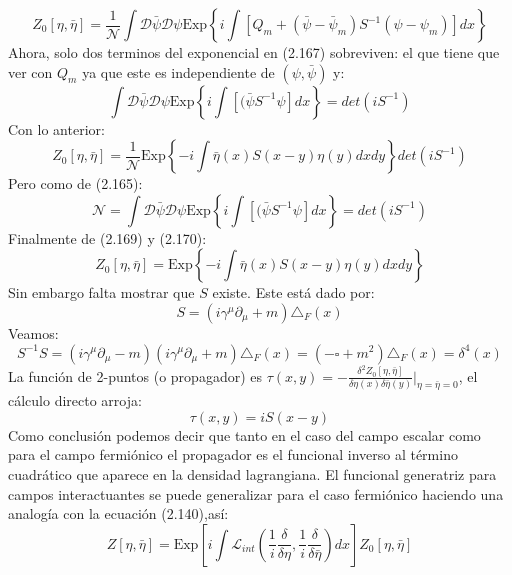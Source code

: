 \begin{equation}
Z_{0}[\eta,\bar{\eta}]=\frac{1}{\mathcal{N}}\int\mathcal{D}\bar{\psi}\mathcal{\mathcal{D}}\psi\text{Exp}\left\{ i\int\left[Q_{m}+(\bar{\psi}-\bar{\psi}_{m})S^{-1}(\psi-\psi_{m})\right]dx\right\} 
\end{equation}
Ahora, solo dos terminos del exponencial en (2.167) sobreviven: el que tiene que ver con $Q_m$ ya que este es independiente de $(\psi,\bar{\psi})$ y:
\begin{equation}
\int\mathcal{D}\bar{\psi}\mathcal{\mathcal{D}}\psi\text{Exp}\left\{ i\int\left[(\bar{\psi}S^{-1}\psi\right]dx\right\} =det(iS^{-1})
\end{equation}
Con lo anterior:
\begin{equation}
Z_{0}[\eta,\bar{\eta}]=\frac{1}{\mathcal{N}}\text{Exp}\left\{ -i\int\bar{\eta}(x)S(x-y)\eta(y)dxdy\right\} det(iS^{-1})
\end{equation}
Pero como de (2.165):
\begin{equation}
\mathcal{N}=\int\mathcal{D}\bar{\psi}\mathcal{\mathcal{D}}\psi\text{Exp}\left\{ i\int\left[(\bar{\psi}S^{-1}\psi\right]dx\right\} =det(iS^{-1})
\end{equation}
Finalmente de (2.169) y (2.170):
\begin{equation}
Z_{0}[\eta,\bar{\eta}]=\text{Exp}\left\{ -i\int\bar{\eta}(x)S(x-y)\eta(y)dxdy\right\} 
\end{equation}
Sin embargo falta mostrar que $S$ existe. Este está dado por:
\begin{equation}
S=(i\gamma^{\mu}\partial_{\mu}+m)\triangle_{F}(x)
\end{equation}
Veamos:
\begin{equation}
S^{-1}S=(i\gamma^{\mu}\partial_{\mu}-m)(i\gamma^{\mu}\partial_{\mu}+m)\triangle_{F}(x)=(-\square+m^{2})\triangle_{F}(x)=\delta^{4}(x)
\end{equation}
La función de 2-puntos (o propagador) es $\tau(x,y)=-\frac{\delta^{2}Z_{0}[\eta,\bar{\eta}]}{\delta\eta(x)\delta\bar{\eta}(y)}|_{\eta=\bar{\eta}=0}$, el cálculo directo arroja:
\begin{equation}
\tau(x,y)=iS(x-y)
\end{equation}
Como conclusión podemos decir que tanto en el caso del campo escalar como para el campo fermiónico el propagador es el funcional inverso al término cuadrático que aparece en la densidad lagrangiana. El funcional generatriz para campos interactuantes se puede generalizar para el caso fermiónico haciendo una analogía con la ecuación (2.140),así:
\begin{equation}
Z[\eta,\bar{\eta}]=\text{Exp}\left[i\int\mathcal{L}_{int}\left(\frac{1}{i}\frac{\delta}{\delta\eta},\frac{1}{i}\frac{\delta}{\delta\bar{\eta}}\right)dx\right]Z_{0}[\eta,\bar{\eta}]
\end{equation}

